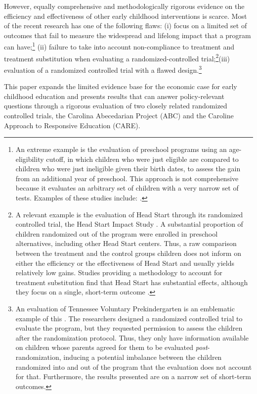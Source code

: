 However, equally comprehensive and methodologically rigorous evidence on the efficiency and effectiveness of other early childhood interventions is scarce. Most of the recent research has one of the following flaws: (i) focus on a limited set of outcomes that fail to measure the widespread and lifelong impact that a program can have;\footnote{An extreme example is the evaluation of preschool programs using an age-eligibility cutoff, in which children who were just eligible are compared to children who were just ineligible given their birth dates, to assess the gain from an additional year of preschool. This approach is not comprehensive because it evaluates an arbitrary set of children with a very narrow set of tests. Examples of these studies include: \citep{Gormley_Gayer_2005_JHR,Gormley_Gayer_etal_2005_DP,Weiland_2013_CD_Impacts-of-Pre-K}.} (ii) failure to take into account non-compliance to treatment and treatment substitution when evaluating a randomized-controlled trial;\footnote{A relevant example is the evaluation of Head Start through its randomized controlled trial, the Head Start Impact Study \citep{Puma_Bell_etal_2010_HeadStartImpact}. A substantial proportion of children randomized out of the program were enrolled in preschool alternatives, including other Head Start centers. Thus, a raw comparison between the treatment and the control groups children does not inform on either the efficiency or the effectiveness of Head Start and usually yields relatively low gains. Studies providing a methodology to account for treatment substitution find that Head Start has substantial effects, although they focus on a single, short-term outcome \citep{Kline-Walters_2015_NBER-Evaluating,Feller_Grindal_etal_2016_ComparedtoWhat}.}(iii) evaluation of a randomized controlled trial with a flawed design.\footnote{An evaluation of Tennessee Voluntary Prekindergarten is an emblematic example of this \citep{Lipsey_et_al_2013_Tennessee_Kindergrtn_PRI,Lipsey_et_al_2015_Randomized_Control_Trial_PRI}. The researchers designed a randomized controlled trial to evaluate the program, but they requested permission to assess the children after the randomization protocol. Thus, they only have information available on children whose parents agreed for them to be evaluated \textit{post}-randomization, inducing a potential imbalance between the children randomized into and out of the program that the evaluation does not account for that. Furthermore, the results presented are on a narrow set of short-term outcomes.} 

This paper expands the limited evidence base for the economic case for early childhood education and presents results that can answer policy-relevant questions through a rigorous evaluation of two closely related randomized controlled trials, the Carolina Abecedarian Project (ABC) and the Caroline Approach to Responsive Education (CARE).

